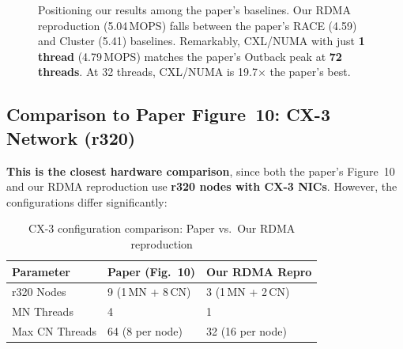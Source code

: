 \documentclass[11pt,a4paper]{article}
\begin{document}
\begin{figure}[H]
\centering
{}
\caption{Positioning our results among the paper's baselines. Our RDMA reproduction (5.04\,MOPS) falls between the paper's RACE (4.59) and Cluster (5.41) baselines. Remarkably, CXL/NUMA with just \textbf{1 thread} (4.79\,MOPS) matches the paper's Outback peak at \textbf{72 threads}. At 32 threads, CXL/NUMA is 19.7$\times$ the paper's best.}
\label{fig:baselines-detail}
\end{figure}

\subsection{Comparison to Paper Figure~10: CX-3 Network (r320)}

\textbf{This is the closest hardware comparison}, since both the paper's Figure~10 and our RDMA reproduction use \textbf{r320 nodes with CX-3 NICs}. However, the configurations differ significantly:

\begin{table}[H]
\centering
\caption{CX-3 configuration comparison: Paper vs.\ Our RDMA reproduction}
\label{tab:cx3-config}
\begin{tabular}{@{}lll@{}}
\toprule
\textbf{Parameter} & \textbf{Paper (Fig.~10)} & \textbf{Our RDMA Repro} \\
\midrule
r320 Nodes          & 9 (1\,MN + 8\,CN) & 3 (1\,MN + 2\,CN) \\
MN Threads           & 4 & 1 \\
Max CN Threads       & 64 (8 per node) & 32 (16 per node) \\
\bottomrule
\end{tabular}
\end{table}
\end{document}
